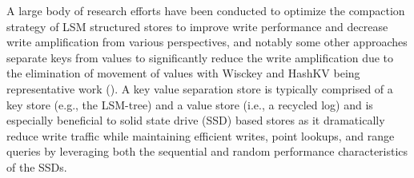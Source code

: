 \documentclass[sigconf]{acmart}
\begin{document}

A large body of research efforts have been conducted to optimize the compaction strategy of LSM structured stores to improve write performance \cite{HyperLevelDB,bLSM,PCP,cLSM,CM} and decrease write amplification \cite{LSMtrie,skiptree,LWCtree,TRIAD} from various perspectives, and notably some other approaches separate keys from values to significantly reduce the write amplification due to the elimination of movement of values with Wisckey \cite{Wisckey} and HashKV \cite{HashKV} being representative work ({\color{red}{KV separated stores}}). A key value separation store is typically comprised of a key store (e.g., the LSM-tree) and a value store (i.e., a recycled log) and is especially beneficial to solid state drive (SSD) based stores as it dramatically reduce write traffic while maintaining efficient writes, point lookups, and range queries by leveraging both the sequential and random performance characteristics of the SSDs. 

\end{document}
